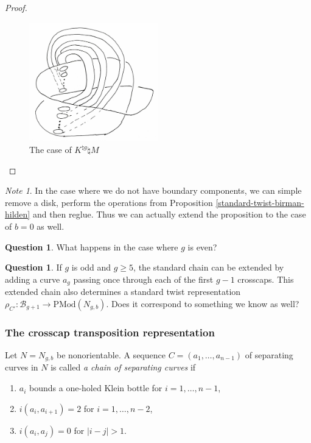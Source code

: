 \documentclass[reqno]{amsart}
\theoremstyle{definition}
\newtheorem{question}[theorem]{Question}
\theoremstyle{remark}
\newtheorem*{note}{Note}
\newcommand{\PMod}{{\mathrm{PMod}}}
\begin{document}
\begin{proof}
\begin{figure}[htpb]
    \centering
    \includegraphics[width=0.5\textwidth]{many-klein-torus-curve.jpg}
    \caption{The case of $K^{\natural g} \natural M$}
    \label{fig:many-klein-torus-curve-jpg}
\end{figure}

\end{proof}

\begin{note}
    In the case where we do not have boundary components, we
    can simple remove a disk, perform the operations 
    from Proposition \ref{standard-twist-birman-hilden} and then
    reglue. Thus we can actually extend the proposition
    to the case of $b = 0$ as well.
\end{note}

\begin{question}
    What happens in the case where
    $g$ is even?
\end{question}

\begin{question}
    If $g$ is odd and $g \ge 5$, the standard chain
    can be extended by adding a curve
    $a_g$ passing once through each of the first
    $g-1$ crosscaps. This
    extended chain also determines
    a standard twist representation
    $\rho_{C'} \colon \mathcal{B}_{g+1} \to 
    \PMod \left( N_{g,b} \right) $. Does it correspond to
    something we know as well?
\end{question}

\subsubsection{The crosscap transposition representation}

Let $N = N_{g,b}$ be nonorientable. A sequence
$C = \left( a_1, \ldots, a_{n-1} \right) $ of separating
curves in $N$ is called \textit{a chain of separating curves} if
\begin{enumerate}
    \item $a_i$ bounds a one-holed Klein bottle
        for $i = 1, \ldots, n-1$,
    \item $i \left( a_i, a_{i+1} \right) = 2$ for
        $i = 1,\ldots, n-2$,
    \item $i\left( a_i, a_j \right) = 0$ for
        $\left| i-j \right| > 1$.
\end{enumerate}
\end{document}
